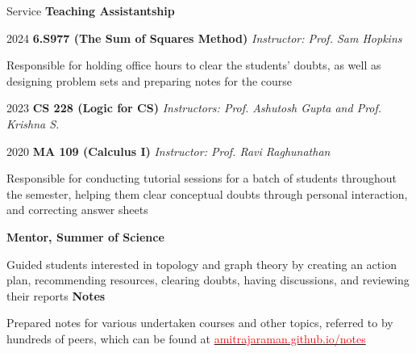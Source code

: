 
\begin{rubric}{Service}
    \entry* \textbf{Teaching Assistantship}

       2024 \quad \textbf{6.S977 (The Sum of Squares Method)} \hfill \emph{Instructor: Prof. Sam Hopkins}

       Responsible for holding office hours to clear the students' doubts, as well as designing problem sets and preparing notes for the course 
       

       2023 \quad \textbf{CS 228 (Logic for CS)} \hfill  \emph{Instructors: Prof. Ashutosh Gupta and Prof. Krishna S.}

       2020 \quad \textbf{MA 109 (Calculus I)} \hfill \emph{Instructor: Prof. Ravi Raghunathan}

	    Responsible for conducting tutorial sessions for a batch of students throughout the semester, helping them clear conceptual doubts through personal interaction, and correcting answer sheets




	\entry*[2021--2022] \textbf{Mentor, Summer of Science}

		Guided students interested in topology and graph theory by creating an action plan, recommending resources, clearing doubts, having discussions, and reviewing their reports
	\entry*[2020--2023] \textbf{Notes}

		Prepared notes for various undertaken courses and other topics, referred to by hundreds of peers, which can be found at \href{https://amitrajaraman.github.io/notes}{\textcolor{red}{amitrajaraman.github.io/notes}}
\end{rubric}